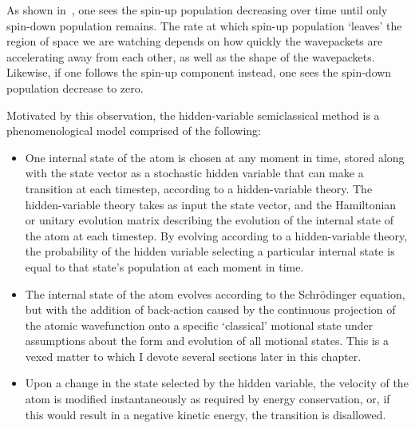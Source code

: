 As shown in~, one sees the spin-up population decreasing over time until only spin-down population remains. The rate at which spin-up population `leaves' the region of space we are watching depends on how quickly the wavepackets are accelerating away from each other, as well as the shape of the wavepackets. Likewise, if one follows the spin-up component instead, one sees the spin-down population decrease to zero.

Motivated by this observation, the hidden-variable semiclassical method is a phenomenological model comprised of the following:
\begin{itemize}
\item{One internal state of the atom is chosen at any moment in time, stored along with the state vector as a stochastic hidden variable that can make a transition at each timestep, according to a hidden-variable theory. The hidden-variable theory takes as input the state vector, and the Hamiltonian or unitary evolution matrix describing the evolution of the internal state of the atom at each timestep. By evolving according to a hidden-variable theory, the probability of the hidden variable selecting a particular internal state is equal to that state's population at each moment in time.}
\item{The internal state of the atom evolves according to the Schr\"odinger equation, but with the addition of back-action caused by the continuous projection of the atomic wavefunction onto a specific `classical' motional state under assumptions about the form and evolution of all motional states. This is a vexed matter to which I devote several sections later in this chapter.}
\item{Upon a change in the state selected by the hidden variable, the velocity of the atom is modified instantaneously as required by energy conservation, or, if this would result in a negative kinetic energy, the transition is disallowed.}
\end{itemize}

